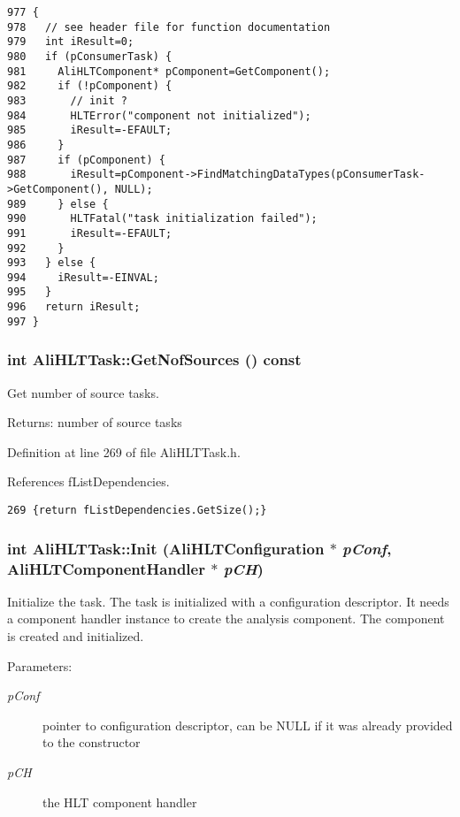 \footnotesize\begin{verbatim}977 {
978   // see header file for function documentation
979   int iResult=0;
980   if (pConsumerTask) {
981     AliHLTComponent* pComponent=GetComponent();
982     if (!pComponent) {
983       // init ?
984       HLTError("component not initialized");
985       iResult=-EFAULT;
986     }
987     if (pComponent) {
988       iResult=pComponent->FindMatchingDataTypes(pConsumerTask->GetComponent(), NULL);
989     } else {
990       HLTFatal("task initialization failed");
991       iResult=-EFAULT;
992     }
993   } else {
994     iResult=-EINVAL;
995   }
996   return iResult;
997 }
\end{verbatim}\normalsize 


\subsubsection{\setlength{\rightskip}{0pt plus 5cm}int Ali\-HLTTask::Get\-Nof\-Sources () const\hspace{0.3cm}{\tt  [inline]}}\label{classAliHLTTask_a28}


Get number of source tasks. \begin{Desc}
\item[Returns:]number of source tasks \end{Desc}


Definition at line 269 of file Ali\-HLTTask.h.

References f\-List\-Dependencies.

\footnotesize\begin{verbatim}269 {return fListDependencies.GetSize();}
\end{verbatim}\normalsize 


\subsubsection{\setlength{\rightskip}{0pt plus 5cm}int Ali\-HLTTask::Init ({\bf Ali\-HLTConfiguration} $\ast$ {\em p\-Conf}, {\bf Ali\-HLTComponent\-Handler} $\ast$ {\em p\-CH})}\label{classAliHLTTask_a5}


Initialize the task. The task is initialized with a configuration descriptor. It needs a component handler instance to create the analysis component. The component is created and initialized. \begin{Desc}
\item[Parameters:]
\begin{description}
\item[{\em p\-Conf}]pointer to configuration descriptor, can be NULL if it was already provided to the constructor \item[{\em p\-CH}]the HLT component handler \end{description}
\end{Desc}


